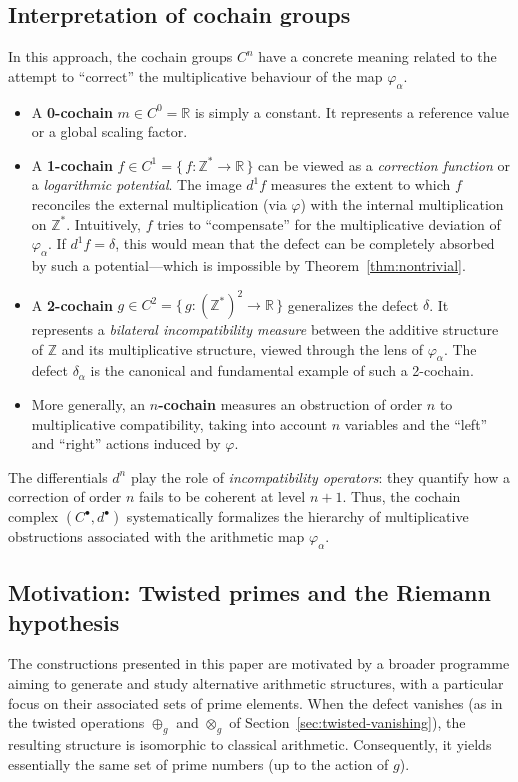 \documentclass[11pt,a4paper]{article}
\theoremstyle{plain}
\theoremstyle{definition}
\theoremstyle{remark}
\newcommand{\ZZ}{\mathbb{Z}}
\newcommand{\RR}{\mathbb{R}}
\begin{document}
	\subsection{Interpretation of cochain groups}
	\label{subsec:cochains}
	In this approach, the cochain groups $C^n$ have a concrete meaning related to the attempt to ``correct'' the multiplicative behaviour of the map $\varphi_\alpha$.
	\begin{itemize}
		\item A \textbf{0-cochain} $m \in C^0 = \RR$ is simply a constant. It represents a reference value or a global scaling factor.
		\item A \textbf{1-cochain} $f \in C^1 = \{\, f: \ZZ^* \to \RR \,\}$ can be viewed as a \emph{correction function} or a \emph{logarithmic potential}. The image $d^1 f$ measures the extent to which $f$ reconciles the external multiplication (via $\varphi$) with the internal multiplication on $\ZZ^*$. Intuitively, $f$ tries to ``compensate'' for the multiplicative deviation of $\varphi_\alpha$. If $d^1 f = \delta$, this would mean that the defect can be completely absorbed by such a potential---which is impossible by Theorem~\ref{thm:nontrivial}.
		\item A \textbf{2-cochain} $g \in C^2 = \{\, g: (\ZZ^*)^2 \to \RR \,\}$ generalizes the defect $\delta$. It represents a \emph{bilateral incompatibility measure} between the additive structure of $\ZZ$ and its multiplicative structure, viewed through the lens of $\varphi_\alpha$. The defect $\delta_\alpha$ is the canonical and fundamental example of such a 2-cochain.
		\item More generally, an \textbf{$n$-cochain} measures an obstruction of order $n$ to multiplicative compatibility, taking into account $n$ variables and the ``left'' and ``right'' actions induced by $\varphi$.
	\end{itemize}
	The differentials $d^n$ play the role of \emph{incompatibility operators}: they quantify how a correction of order $n$ fails to be coherent at level $n+1$. Thus, the cochain complex $(C^\bullet, d^\bullet)$ systematically formalizes the hierarchy of multiplicative obstructions associated with the arithmetic map $\varphi_\alpha$.
	
	\subsection{Motivation: Twisted primes and the Riemann hypothesis}
	\label{subsec:motivation}
	The constructions presented in this paper are motivated by a broader programme aiming to generate and study alternative arithmetic structures, with a particular focus on their associated sets of prime elements. When the defect vanishes (as in the twisted operations $\oplus_g$ and $\otimes_g$ of Section~\ref{sec:twisted-vanishing}), the resulting structure is isomorphic to classical arithmetic. Consequently, it yields essentially the same set of prime numbers (up to the action of $g$).
	
\end{document}
